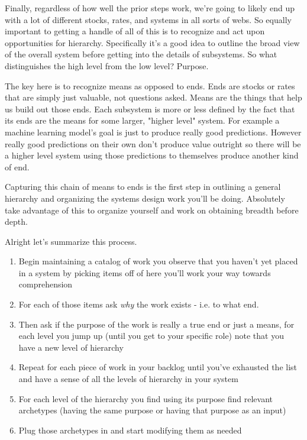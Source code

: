 \documentclass[11pt,a5paper]{book}
\begin{document}
Finally, regardless of how well the prior steps work, we're going to likely end up with a lot of different stocks, rates, and systems in all sorts of webs. So equally important to getting a handle of all of this is to recognize and act upon opportunities for hierarchy. Specifically it's a good idea to outline the broad view of the overall system before getting into the details of subsystems. So what distinguishes the high level from the low level? Purpose. 
\newline

The key here is to recognize means as opposed to ends. Ends are stocks or rates that are simply just valuable, not questions asked. Means are the things that help us build out those ends. Each subsystem is more or less defined by the fact that its ends are the means for some larger, "higher level" system. For example a machine learning model's goal is just to produce really good predictions. However really good predictions on their own don't produce value outright so there will be a higher level system using those predictions to themselves produce another kind of end. 
\newline

Capturing this chain of means to ends is the first step in outlining a general hierarchy and organizing the systems design work you'll be doing. Absolutely take advantage of this to organize yourself and work on obtaining breadth before depth.
\newline

Alright let's summarize this process.

\begin{enumerate}
\item Begin maintaining a catalog of work you observe that you haven't yet placed in a system by picking items off of here you'll work your way towards comprehension
\item For each of those items ask \textit{why} the work exists - i.e. to what end.
\item Then ask if the purpose of the work is really a true end or just a means, for each level you jump up (until you get to your specific role) note that you have a new level of hierarchy
\item Repeat for each piece of work in your backlog until you've exhausted the list and have a sense of all the levels of hierarchy in your system
\item For each level of the hierarchy you find using its purpose find relevant archetypes (having the same purpose or having that purpose as an input)
\item Plug those archetypes in and start modifying them as needed
\end{enumerate}
\end{document}
